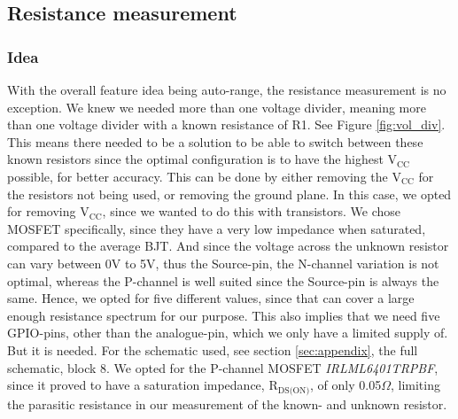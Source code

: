 \subsection{Resistance measurement}

\subsubsection{Idea}
\label{sec:method_resistance_idea}
With the overall feature idea being auto-range, the resistance measurement is no exception. We knew we needed more than one voltage divider, meaning more than one voltage divider with a known resistance of R1. See Figure \ref{fig:vol_div}. This means there needed to be a solution to be able to switch between these known resistors since the optimal configuration is to have the highest V$_{\text{CC}}$ possible, for better accuracy. This can be done by either removing the V$_{\text{CC}}$ for the resistors not being used, or removing the ground plane.
In this case, we opted for removing V$_{\text{CC}}$, since we wanted to do this with transistors. We chose MOSFET specifically, since they have a very low impedance when saturated, compared to the average BJT. And since the voltage across the unknown resistor can vary between 0V to 5V, thus the Source-pin, the N-channel variation is not optimal, whereas the P-channel is well suited since the Source-pin is always the same. Hence, we opted for five different values, since that can cover a large enough resistance spectrum for our purpose. This also implies that we need five GPIO-pins, other than the analogue-pin, which we only have a limited supply of. But it is needed. For the schematic used, see section \ref{sec:appendix}, the full schematic, block 8. We opted for the P-channel MOSFET \textit{IRLML6401TRPBF}, since it proved to have a saturation impedance, R$_{\text{DS(ON)}}$, of only 0.05$\Omega$, limiting the parasitic resistance in our measurement of the known- and unknown resistor.


